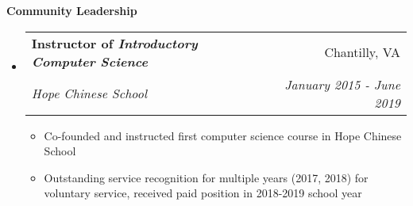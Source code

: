 \documentclass[letterpaper,10pt]{article}
\makeatletter
\newcommand{\resitem}[1]{\item #1 \vspace{-3.5pt}}
\newcommand{\resheading}[1]{{\large \colorbox{mygrey}{\begin{minipage}{\textwidth}{\textbf{#1 \vphantom{p\^{E}}}}\end{minipage}}}}
\newcommand{\ressubheading}[4]{
\begin{tabular*}{7.0in}{l@{\extracolsep{\fill}}r}
		\textbf{#1} & #2 \\
		\textit{#3} & \textit{#4} \\
\end{tabular*}\vspace{-6pt}}
\makeatother
\begin{document}
\begin{itemize}
\begin{itemize}
	\end{itemize}
	
\end{itemize}

\resheading{Community Leadership}
\begin{itemize}
\item
	\ressubheading{Instructor of \textit{Introductory Computer Science}}{Chantilly, VA}{Hope Chinese School}{January 2015 - June 2019}
	\begin{itemize}
	    \resitem{Co-founded and instructed first computer science course in Hope Chinese School}
	    \resitem{Outstanding service recognition for multiple years (2017, 2018) for voluntary service, received paid position in 2018-2019 school year}
	\end{itemize}
	
\end{itemize}
\end{document}
